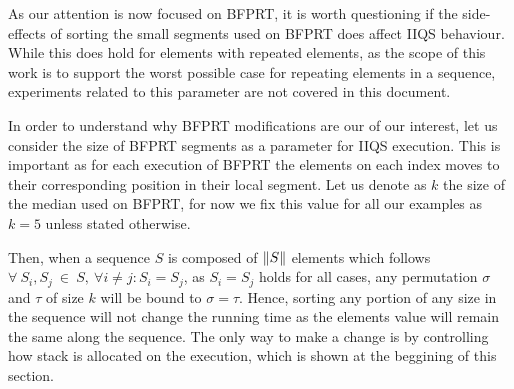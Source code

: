 As our attention is now focused on BFPRT, it is worth questioning if the side-effects of sorting the small segments used on BFPRT does affect IIQS behaviour. While this does hold for elements with repeated elements, as the scope of this work is to support the worst possible case for repeating elements in a sequence, experiments related to this parameter are not covered in this document.

In order to understand why BFPRT modifications are our of our interest, let us consider the size of BFPRT segments as a parameter for IIQS execution. This is important as for each execution of BFPRT the elements on each index moves to their corresponding position in their local segment. Let us denote as $k$ the size of the median used on BFPRT, for now we fix this value for all our examples as $k=5$ unless stated otherwise.

Then, when a sequence $S$ is composed of $\lVert S\rVert$ elements which follows $\forall~S_i, S_j~\in~S,~\forall i \neq j : S_i=S_j$, as $S_i=S_j$ holds for all cases, any permutation $\sigma$ and $\tau$ of size $k$ will be bound to $\sigma = \tau$. Hence, sorting any portion of any size in the sequence will not change the running time as the elements value will remain the same along the sequence. The only way to make a change is by controlling how stack is allocated on the execution, which is shown at the beggining of this section.

\FloatBarrier